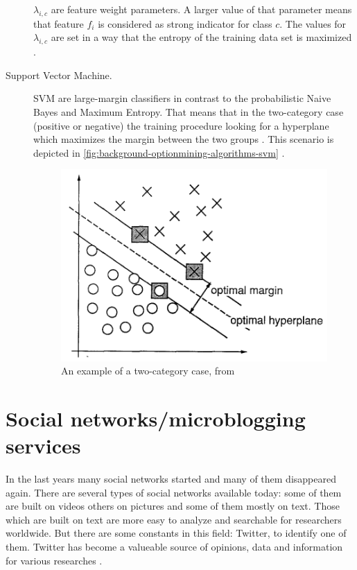 \begin{description}
  $\lambda_{i,c}$ are feature weight parameters. A larger value of that parameter means that feature $f_i$ is considered as strong indicator for class $c$.
  The values for $\lambda_{i,c}$ are set in a way that the entropy of the training data set is maximized \cite{Pang2002}.
  	
	\item[Support Vector Machine.]
   \ac{SVM} are large-margin classifiers in contrast to the probabilistic Naive Bayes and Maximum Entropy.
   That means that in the two-category case (positive or negative) the training procedure looking for a hyperplane which maximizes the margin between the two groups \cite{Pang2002}.
   This scenario is depicted in \autoref{fig:background-optionmining-algorithms-svm} \cite[p. 275]{Cortes1995}.
      
   \begin{figure}[ht]
    \centering
    \includegraphics[width=.7\textwidth]{images/svm.png}
    \caption{An example of a two-category case, from \cite[p. 275]{Cortes1995}}
    \label{fig:background-optionmining-algorithms-svm}
  \end{figure}
	
\end{description}




\section{Social networks/microblogging services}
\label{s:background-socialnetworks}

In the last years many social networks started and many of them disappeared again.
There are several types of social networks available today: some of them are built on videos others on pictures and some of them mostly on text.
Those which are built on text are more easy to analyze and searchable for researchers worldwide.
But there are some constants in this field: Twitter, to identify one of them.
Twitter has become a valueable source of opinions, data and information for various researches \cite{Barbosa2010}.

